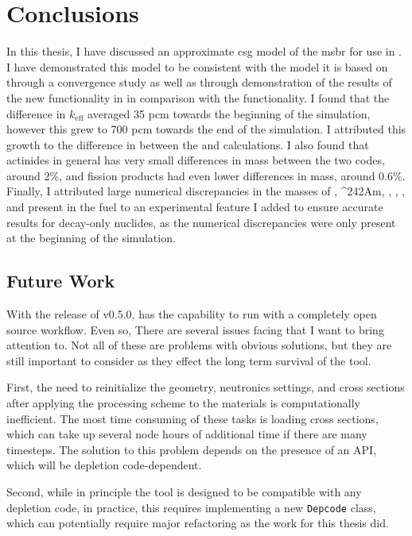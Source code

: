 \chapter{Conclusions}
\label{ch:chapter6}
\glsresetall

In this thesis, I have discussed an approximate \Gls{csg} model of the
\Gls{msbr} for use in \OpenMC. I have demonstrated this model to be consistent
with the \SerpentTWO model it is based on through a convergence study as well as
through demonstration of the results of the new \OpenMC functionality in
\SaltProc in comparison with the \SerpentTWO functionality.
I found that the difference in $k_\text{eff}$ averaged 35 pcm
towards the beginning of the simulation, however this grew to
700 pcm towards the end of the simulation. I attributed this growth
to the difference in  between the \OpenMC and \SerpentTWO
calculations. I also found that actinides in general has very small
differences in mass between the two codes, around 2\%, and fission products
had even lower differences in mass, around 0.6\%. Finally, I attributed
large numerical discrepancies in the masses of , \ce^{{242}Am},
, , , and  present in the fuel
to an experimental \OpenMC feature I added to ensure accurate results for decay-only
nuclides, as the numerical discrepancies were only present at the beginning of the simulation.

\section{Future Work}
With the release of v0.5.0, \SaltProc has the capability to run
with a completely open source workflow. Even so, There are several issues facing \SaltProc
that I want to bring attention to. Not all of these are problems with obvious
solutions, but they are still important to consider as they effect the long
term survival of the tool.

First, the need to reinitialize the geometry, neutronics
settings, and cross sections after applying the processing scheme to the
materials is computationally inefficient. The most time consuming of these tasks
is loading cross sections, which can take up several node hours of additional
time if there are many timesteps. The solution to this problem depends on
the presence of an API, which will be depletion code-dependent.

Second, while in principle the tool is
designed to be compatible with any depletion code, in practice, this requires
implementing a new \verb.Depcode. class, which can potentially require major
refactoring as the work for this thesis did.

